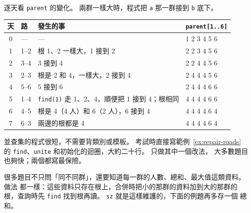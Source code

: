 
逐天看 \texttt{parent} 的變化。 兩群一樣大時，程式把 \texttt{a} 那一群接到
\texttt{b} 底下。

\begin{center}
\begin{tabular}{clll}
\toprule
天 & 路 & 發生的事 & \texttt{parent[1..6]} \\
\midrule
0 & --- & --- & 1 2 3 4 5 6 \\
1 & 1--2 & 根 1、2 一樣大，1 接到 2 & 2 2 3 4 5 6 \\
2 & 3--4 & 3 接到 4 & 2 2 4 4 5 6 \\
3 & 2--3 & 根是 2 和 4，一樣大，2 接到 4 & 2 4 4 4 5 6 \\
4 & 5--6 & 5 接到 6 & 2 4 4 4 6 6 \\
5 & 1--4 & \texttt{find(1)} 走 1、2、4，順便把 1 接到 4；根相同 & 4 4 4 4 6 6 \\
6 & 4--5 & 根是 4（4 人）和 6（2 人），6 接到 4 & 4 4 4 4 6 4 \\
7 & 6--3 & 兩邊的根都是 4 & 4 4 4 4 6 4 \\
\bottomrule
\end{tabular}
\end{center}

\begin{apcsnote}
並查集的程式很短，不需要背類別或模板。 考試時直接寫範例~\ref{ex:repair-roads} 的
\texttt{find}、\texttt{unite} 和初始化的迴圈，大約二十行。 只做其中一個改法，
大多數題目也夠快；兩個都寫最保險。
\end{apcsnote}

很多題目不只問「同不同群」，還要知道每一群的人數、總和、最大值這類資料。 做法
都一樣：這些資料只存在根上，合併時把小的那群的資料加到大的那群的根，查詢時先
\texttt{find} 找到根再讀。 \texttt{sz} 就是這樣維護的，下面的例題再多存一個
總和。

